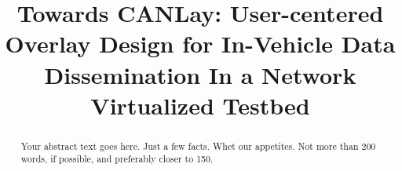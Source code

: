 \documentclass[letterpaper,twocolumn,10pt]{article}
\begin{document}

\date{}

\title{\Large \bf Towards CANLay: User-centered Overlay Design for In-Vehicle Data Dissemination In a Network Virtualized Testbed}


\maketitle

\begin{abstract}
Your abstract text goes here. Just a few facts. Whet our appetites.
Not more than 200 words, if possible, and preferably closer to 150.
\end{abstract}
\end{document}

